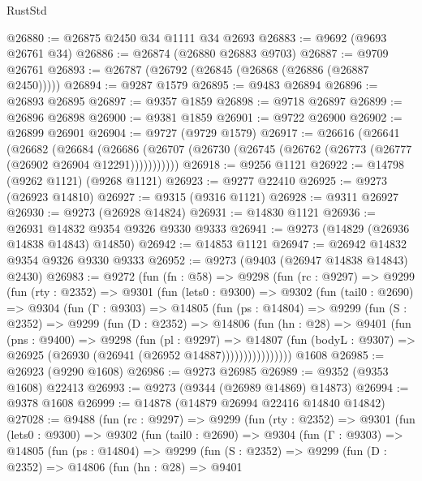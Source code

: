 \begin{lexlean}{RustStd}
\begin{coremodule}
@26880 := @26875 @2450 @34 @1111 @34 @2693
@26883 := @9692 (@9693 @26761 @34)
@26886 := @26874 (@26880 @26883 @9703)
@26887 := @9709 @26761
@26893 := @26787 (@26792 (@26845 (@26868 (@26886 (@26887 @2450)))))
@26894 := @9287 @1579
@26895 := @9483 @26894
@26896 := @26893 @26895
@26897 := @9357 @1859
@26898 := @9718 @26897
@26899 := @26896 @26898
@26900 := @9381 @1859
@26901 := @9722 @26900
@26902 := @26899 @26901
@26904 := @9727 (@9729 @1579)
@26917 := @26616
    (@26641
      (@26682
        (@26684
          (@26686 (@26707 (@26730 (@26745 (@26762 (@26773 (@26777 (@26902 @26904 @12291)))))))))))
@26918 := @9256 @1121
@26922 := @14798 (@9262 @1121) (@9268 @1121)
@26923 := @9277 @22410
@26925 := @9273 (@26923 @14810)
@26927 := @9315 (@9316 @1121)
@26928 := @9311 @26927
@26930 := @9273 (@26928 @14824)
@26931 := @14830 @1121
@26936 := @26931 @14832 @9354 @9326 @9330 @9333
@26941 := @9273 (@14829 (@26936 @14838 @14843) @14850)
@26942 := @14853 @1121
@26947 := @26942 @14832 @9354 @9326 @9330 @9333
@26952 := @9273 (@9403 (@26947 @14838 @14843) @2430)
@26983 := @9272
    (fun (fn : @58) =>
    @9298
      (fun (rc : @9297) =>
      @9299
        (fun (rty : @2352) =>
        @9301
          (fun (lets0 : @9300) =>
          @9302
            (fun (tail0 : @2690) =>
            @9304
              (fun (Γ : @9303) =>
              @14805
                (fun (ps : @14804) =>
                @9299
                  (fun (S : @2352) =>
                  @9299
                    (fun (D : @2352) =>
                    @14806
                      (fun (hn : @28) =>
                      @9401
                        (fun (pns : @9400) =>
                        @9298
                          (fun (pl : @9297) =>
                          @14807
                            (fun (bodyL : @9307) =>
                            @26925 (@26930 (@26941 (@26952 @14887))))))))))))))))
    @1608
@26985 := @26923 (@9290 @1608)
@26986 := @9273 @26985
@26989 := @9352 (@9353 @1608) @22413
@26993 := @9273 (@9344 (@26989 @14869) @14873)
@26994 := @9378 @1608
@26999 := @14878 (@14879 @26994 @22416 @14840 @14842)
@27028 := @9488
    (fun (rc : @9297) =>
    @9299
      (fun (rty : @2352) =>
      @9301
        (fun (lets0 : @9300) =>
        @9302
          (fun (tail0 : @2690) =>
          @9304
            (fun (Γ : @9303) =>
            @14805
              (fun (ps : @14804) =>
              @9299
                (fun (S : @2352) =>
                @9299
                  (fun (D : @2352) =>
                  @14806
                    (fun (hn : @28) =>
                    @9401

\end{coremodule}
\end{lexlean}
